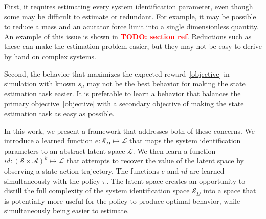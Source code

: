\documentclass{article}
\newcommand{\TODO}[1]{\textcolor{red}{\textbf{TODO: #1}}}
\newcommand{\cA}{\mathcal{A}}
\newcommand{\cL}{\mathcal{L}}
\newcommand{\cS}{\mathcal{S}}
\begin{document}
First, it requires estimating every system identification parameter,
even though some may be difficult to estimate or redundant.
For example, it may be possible to reduce a mass and an acutator force limit into a single dimensionless quantity.
An example of this issue is shown in \TODO{section ref}.
Reductions such as these can make the estimation problem easier, but they may not be easy to derive by hand on complex systems.

Second, the behavior that maximizes the expected reward~\eqref{objective}
in simulation with known $s_d$ may not be the best behavior for making the state estimation task easier.
It is preferable to learn a behavior that balances the primary objective~\eqref{objective}
with a secondary objective of making the state estimation task as easy as possible.

In this work, we present a framework that addresses both of these concerns.
We introduce a learned function $e : \cS_D \mapsto \cL$
that maps the system identification parameters to an abstract latent space $\cL$.
We then learn a function $id : (\cS \times \cA)^k \mapsto \cL$
that attempts to recover the value of the latent space by observing a state-action trajectory.
The functions $e$ and $id$ are learned simultaneously with the policy $\pi$.
The latent space creates an opportunity to distill the full complexity of the system identification space $\cS_D$ into a space that is potentially more useful for the policy to produce optimal behavior,
while simultaneously being easier to estimate.
\end{document}

